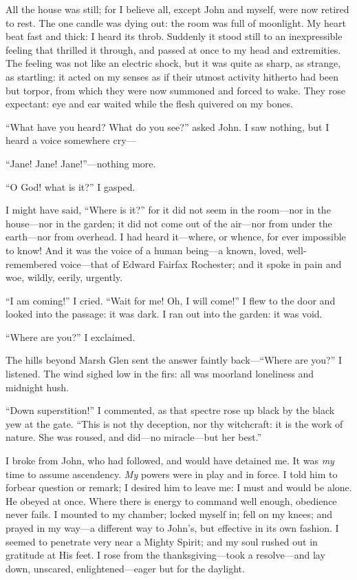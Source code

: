 All the house was still; for I believe all, except \St{} John and myself,
were now retired to rest. The one candle was dying out: the room was
full of moonlight. My heart beat fast and thick: I heard its throb. 
Suddenly it stood still to an inexpressible feeling that thrilled it
through, and passed at once to my head and extremities. The feeling was
not like an electric shock, but it was quite as sharp, as strange, as
startling: it acted on my senses as if their utmost activity hitherto
had been but torpor, from which they were now summoned and forced to
wake. They rose expectant: eye and ear waited while the flesh quivered
on my bones.

\enquote{What have you heard? What do you see?} asked \St{} John. I saw
nothing, but I heard a voice somewhere cry---

\enquote{Jane! Jane! Jane!}---nothing more.

\enquote{O God! what is it?} I gasped.

I might have said, \enquote{Where is it?} for it did not seem in the
room---nor in the house---nor in the garden; it did not come out of the
air---nor from under the earth---nor from overhead. I had heard
it---where, or whence, for ever impossible to know! And it was the
voice of a human being---a known, loved, well-remembered voice---that of
Edward Fairfax Rochester; and it spoke in pain and woe, wildly, eerily,
urgently.

\enquote{I am coming!} I cried. \enquote{Wait for me! Oh, I will
come!} I flew to the door and looked into the passage: it was dark. I
ran out into the garden: it was void.

\enquote{Where are you?} I exclaimed.

The hills beyond Marsh Glen sent the answer faintly
back---\enquote{Where are you?} I listened. The wind sighed low in the
firs: all was moorland loneliness and midnight hush.

\enquote{Down superstition!} I commented, as that spectre rose up black
by the black yew at the gate. \enquote{This is not thy deception, nor
thy witchcraft: it is the work of nature. She was roused, and did---no
miracle---but her best.}

I broke from \St{} John, who had followed, and would have detained me. It
was \emph{my} time to assume ascendency. \emph{My} powers were in play
and in force. I told him to forbear question or remark; I desired him
to leave me: I must and would be alone. He obeyed at once. Where there
is energy to command well enough, obedience never fails. I mounted to
my chamber; locked myself in; fell on my knees; and prayed in my way---a
different way to \St{} John's, but effective in its own fashion. I seemed
to penetrate very near a Mighty Spirit; and my soul rushed out in
gratitude at His feet. I rose from the thanksgiving---took a
resolve---and lay down, unscared, enlightened---eager but for the
daylight.
